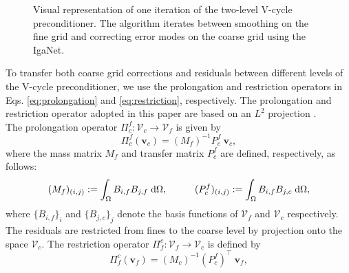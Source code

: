 \documentclass{article}
\theoremstyle{plain}
\numberwithin{equation}{section}
\begin{document}
\begin{figure}[ht!]
    \caption{Visual representation of one iteration of the two-level V-cycle preconditioner. The algorithm iterates between smoothing on the fine grid and correcting error modes on the coarse grid using the IgaNet.}
    \label{fig:v_cycle}
\end{figure}

To transfer both coarse grid corrections and residuals between different levels of the V-cycle preconditioner, we use the prolongation and restriction operators in Eqs. \eqref{eq:prolongation} and \eqref{eq:restriction}, respectively.
The prolongation and restriction operator adopted in this paper are based on an $L^2$ projection \cite{brenner2008mathematical, sampath2010parallel}.
\\
The prolongation operator $\Pi_{c}^f: \mathcal{V}_{c} \rightarrow \mathcal{V}_{f}$ is given by
\begin{equation}
    \label{eq:Pfc}
    \Pi_{c}^f(\mathbf{v}_{c}) = (M_f)^{-1} P_{c}^f \ \mathbf{v}_{c},
\end{equation}
where the mass matrix $M_f$ and transfer matrix $P_{c}^f$ are defined, respectively, as follows:
\begin{equation} \label{PM}
    ( M_{f})_{(i,j)} := \int_{\Omega} B_{i,f} B_{j,f}  \hspace{0.1cm} \text{d} \Omega,  \hspace{1.0cm} (P_{c}^f)_{(i,j)} :=  \int_{\Omega} B_{i,f} B_{j,c}  \hspace{0.1cm} \text{d} \Omega,
\end{equation}
where $\{B_{i,f}\}_i$ and $\{B_{j,c}\}_j$ denote the basis functions of $\mathcal{V}_f$ and $\mathcal{V}_c$ respectively.
\\
The residuals are restricted from fines to the coarse level by projection onto the space $\mathcal{V}_{c}$. The restriction operator  $\Pi_{f}^{c}: \mathcal{V}_{f} \rightarrow \mathcal{V}_{c}$ is defined by
\begin{equation}
    \label{eq:Pcf}
    \Pi_{f}^{c}(\mathbf{v}_{f}) = (M_{c})^{-1} (P_{c}^f)^\top \ \mathbf{v}_{f},
\end{equation}
\end{document}

